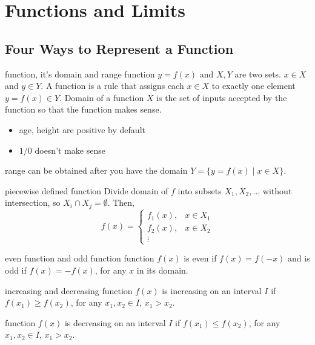 \documentclass[Calculus 1 Recitation.tex]{subfiles}
\begin{document}
\section{Functions and Limits}
\subsection{Four Ways to Represent a Function}
\begin{myleftlinebox}
	function, it's domain and range
	\tcblower
	function $y=f(x)$ and $X, Y$ are two sets. $x\in X$ and $y\in Y$. A function is a rule that assigns each $x\in X$ to exactly one element $y=f(x)\in Y$. Domain of a function $X$ is the set of inputs accepted by the function so that the function makes sense.
	\begin{itemize}
		\item age, height are positive by default
		\item $1/0$ doesn't make sense
	\end{itemize}	
	range can be obtained after you have the domain $Y=\{y=f(x) \mid x\in X\}$.
\end{myleftlinebox}

\begin{myleftlinebox}
	piecewise defined function
	\tcblower
	Divide domain of $f$ into subsets $X_1,X_2,\dots$ without intersection, so $X_i\cap X_j=\emptyset$. Then, 
	\[f(x) = \begin{cases}
		f_1(x), & x\in X_1\\
		f_2(x), & x\in X_2\\
		\vdots
	\end{cases}\]
\end{myleftlinebox}

\begin{myleftlinebox}
	even function and odd function
	\tcblower
	function $f(x)$ is even if $f(x)=f(-x)$ and is odd if $f(x)=-f(x)$, for any $x$ in its domain.
\end{myleftlinebox}

\begin{myleftlinebox}
	increasing and decreasing
	\tcblower
	function $f(x)$ is increasing on an interval $I$ if $f(x_1)\geq f(x_2)$, for any $x_1, x_2\in I$, $x_1>x_2$. 

	function $f(x)$ is decreasing on an interval $I$ if $f(x_1)\leq f(x_2)$, for any $x_1, x_2\in I$, $x_1>x_2$. 
\end{myleftlinebox}
\end{document}
